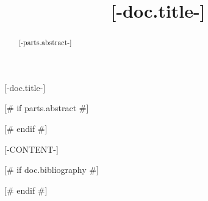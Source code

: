 \documentclass[draft]{article}
[# else #]
\title{[-doc.title-]}
\begin{document}
\begin{center}\huge [-doc.title-]\end{center}

[# if parts.abstract #]
\begin{abstract}
[-parts.abstract-]
\end{abstract}
[# endif #]

[-CONTENT-]

[# if doc.bibliography #]

[# endif #]
\end{document}
